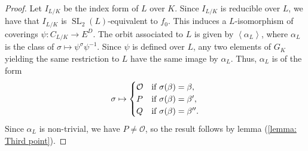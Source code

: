 \documentclass[oneside]{amsart}
\newcommand{\scprod}[1]{\left\langle #1 \right\rangle}
\DeclareMathOperator{\spl}{SL}
\theoremstyle{definition}
\begin{document}
\begin{proof}
    Let $I_{L/K}$ be the index form of $L$ over $K$. Since $I_{L/K}$ is reducible over $L$, we have that $I_{L/K}$ is $\spl_2(L)$-equivalent to $f_0$. This induces a $L$-isomorphism of coverings $\psi: C_{L/K}\to E^D$. The orbit associated to $L$ is given by $\scprod{\alpha_L}$, where $\alpha_L$ is the class of $\sigma \mapsto \psi^{\sigma}\psi^{-1}$. Since $\psi$ is defined over $L$, any two elements of $G_{K}$ yielding the same restriction to $L$ have the same image by $\alpha_L$. Thus, $\alpha_L$ is of the form 
    $$
    \sigma\mapsto
    \begin{cases}
        \mathcal{O}&\textnormal{if }\sigma(\beta) = \beta,\\
        P&\textnormal{if }\sigma(\beta) = \beta',\\
        Q&\textnormal{if }\sigma(\beta) = \beta''.
    \end{cases}
    $$
    Since $\alpha_L$ is non-trivial, we have $P \neq \mathcal{O}$, so the result follows by lemma (\ref{lemma: Third point}).
\end{proof}
\end{document}
